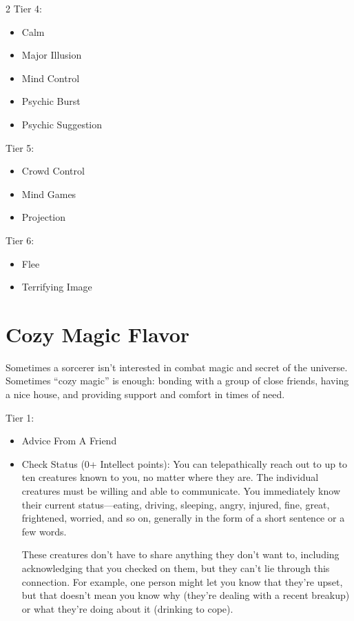 \begin{multicols}{2}
Tier 4:

\begin{itemize}
\item Calm 
\item Major Illusion 
\item Mind Control 
\item Psychic Burst 
\item Psychic Suggestion 
\end{itemize}

Tier 5:
\begin{itemize} 
\item Crowd Control 
\item Mind Games 
\item Projection 
\end{itemize}

Tier 6:
\begin{itemize}
\item Flee 
\item Terrifying Image
\end{itemize}

\section{Cozy Magic Flavor} 

Sometimes a sorcerer isn’t interested in combat magic and secret of the universe. Sometimes “cozy magic” is enough: bonding with a group of close friends, having a nice house, and providing support and comfort in times of need.

Tier 1: 
\begin{itemize}
\item Advice From A Friend 
\item Check Status (0+ Intellect points): You can telepathically reach out to up to ten creatures known to you, no matter where they are. The individual creatures must be willing and able to communicate. You immediately know their current status—eating, driving, sleeping, angry, injured, fine, great, frightened, worried, and so on, generally in the form of a short sentence or a few words. 

These creatures don’t have to share anything they don’t want to, including acknowledging that you checked on them, but they can’t lie through this connection. For example, one person might let you know that they’re upset, but that doesn’t mean you know why (they’re dealing with a recent breakup) or what they’re doing about it (drinking to cope). 


\end{itemize}
\end{multicols}
